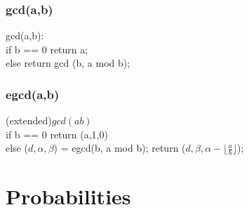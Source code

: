 \documentclass[12pt,a4paper]{article}
\begin{document}
\subsubsection{gcd(a,b)}
gcd(a,b):\\
if b == 0 return a;\\
else return gcd (b, a mod b);
\subsubsection{egcd(a,b)}
(extended)$gcd(ab)$\\
if b == 0 return (a,1,0)\\
else ($d, \alpha, \beta$) = egcd(b, a mod b);
return ($d, \beta, \alpha- \lfloor\frac{a}{b}\rfloor$);

\section{Probabilities}
\end{document}
